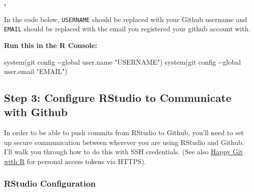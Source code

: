 \documentclass[
  letterpaper,
  DIV=11,
  numbers=noendperiod]{scrartcl}
\newenvironment{Shaded}{\begin{snugshade}}{\end{snugshade}}
\newcommand{\FunctionTok}[1]{\textcolor[rgb]{0.28,0.35,0.67}{#1}}
\newcommand{\NormalTok}[1]{\textcolor[rgb]{0.00,0.23,0.31}{#1}}
\newcommand{\StringTok}[1]{\textcolor[rgb]{0.13,0.47,0.30}{#1}}
\begin{document}
\begin{tcolorbox}[enhanced jigsaw, leftrule=.75mm, colback=white, left=2mm, bottomrule=.15mm, rightrule=.15mm, breakable, arc=.35mm, opacityback=0, colframe=quarto-callout-tip-color-frame, toprule=.15mm]

\textbf{, }\vspace{2mm}

In the code below, \texttt{USERNAME} should be replaced with your Github
username and \texttt{EMAIL} should be replaced with the email you
registered your github account with.

\textbf{Run this in the R Console:}

\begin{Shaded}
\begin{Highlighting}[]
\FunctionTok{system}\NormalTok{(}\StringTok{\textquotesingle{}git config {-}{-}global user.name "USERNAME"\textquotesingle{}}\NormalTok{)}
\FunctionTok{system}\NormalTok{(}\StringTok{\textquotesingle{}git config {-}{-}global user.email "EMAIL"\textquotesingle{}}\NormalTok{)}
\end{Highlighting}
\end{Shaded}

\end{tcolorbox}

\hypertarget{step-3-configure-rstudio-to-communicate-with-github}{%
\subsection{Step 3: Configure RStudio to Communicate with
Github}\label{step-3-configure-rstudio-to-communicate-with-github}}

In order to be able to push commits from RStudio to Github, you'll need
to set up secure communication between wherever you are using RStudio
and Github. I'll walk you through how to do this with SSH credentials.
(See also \href{https://happygitwithr.com/https-pat.html}{Happy Git with
R} for personal access tokens via HTTPS).

\hypertarget{rstudio-configuration}{%
\subsubsection{RStudio Configuration}\label{rstudio-configuration}}
\end{document}
